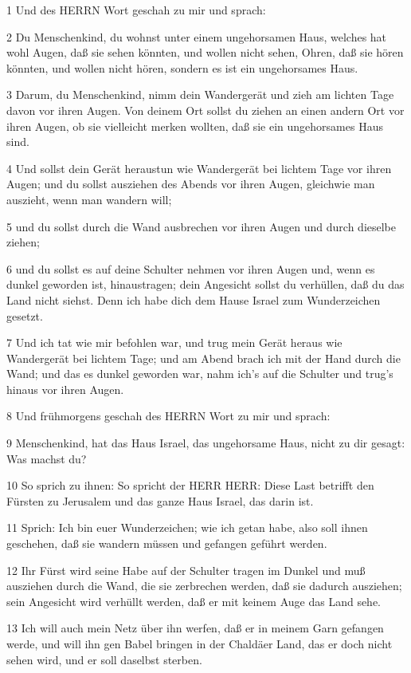 \par 1 Und des HERRN Wort geschah zu mir und sprach:
\par 2 Du Menschenkind, du wohnst unter einem ungehorsamen Haus, welches hat wohl Augen, daß sie sehen könnten, und wollen nicht sehen, Ohren, daß sie hören könnten, und wollen nicht hören, sondern es ist ein ungehorsames Haus.
\par 3 Darum, du Menschenkind, nimm dein Wandergerät und zieh am lichten Tage davon vor ihren Augen. Von deinem Ort sollst du ziehen an einen andern Ort vor ihren Augen, ob sie vielleicht merken wollten, daß sie ein ungehorsames Haus sind.
\par 4 Und sollst dein Gerät heraustun wie Wandergerät bei lichtem Tage vor ihren Augen; und du sollst ausziehen des Abends vor ihren Augen, gleichwie man auszieht, wenn man wandern will;
\par 5 und du sollst durch die Wand ausbrechen vor ihren Augen und durch dieselbe ziehen;
\par 6 und du sollst es auf deine Schulter nehmen vor ihren Augen und, wenn es dunkel geworden ist, hinaustragen; dein Angesicht sollst du verhüllen, daß du das Land nicht siehst. Denn ich habe dich dem Hause Israel zum Wunderzeichen gesetzt.
\par 7 Und ich tat wie mir befohlen war, und trug mein Gerät heraus wie Wandergerät bei lichtem Tage; und am Abend brach ich mit der Hand durch die Wand; und das es dunkel geworden war, nahm ich's auf die Schulter und trug's hinaus vor ihren Augen.
\par 8 Und frühmorgens geschah des HERRN Wort zu mir und sprach:
\par 9 Menschenkind, hat das Haus Israel, das ungehorsame Haus, nicht zu dir gesagt: Was machst du?
\par 10 So sprich zu ihnen: So spricht der HERR HERR: Diese Last betrifft den Fürsten zu Jerusalem und das ganze Haus Israel, das darin ist.
\par 11 Sprich: Ich bin euer Wunderzeichen; wie ich getan habe, also soll ihnen geschehen, daß sie wandern müssen und gefangen geführt werden.
\par 12 Ihr Fürst wird seine Habe auf der Schulter tragen im Dunkel und muß ausziehen durch die Wand, die sie zerbrechen werden, daß sie dadurch ausziehen; sein Angesicht wird verhüllt werden, daß er mit keinem Auge das Land sehe.
\par 13 Ich will auch mein Netz über ihn werfen, daß er in meinem Garn gefangen werde, und will ihn gen Babel bringen in der Chaldäer Land, das er doch nicht sehen wird, und er soll daselbst sterben.

